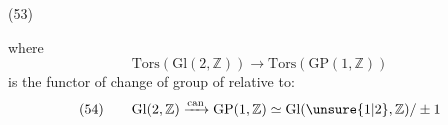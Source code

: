 \begin{samepage}
(53)\quad
{}
\end{samepage}

where 
\[
\mathrm{Tors}(\mathrm{Gl}(2,\mathbb Z))\longrightarrow
\mathrm{Tors}(\mathrm{GP}(1,\mathbb Z))
\]
is the functor of change of group of  relative to:
\[
(54)\qquad
\mathrm{Gl}(2,\mathbb Z)\xrightarrow{\mathrm{can}}
\mathrm{GP}(1,\mathbb Z)\simeq
\mathrm{Gl}(\unsure{1|2},\mathbb Z)/\pm1
\]

